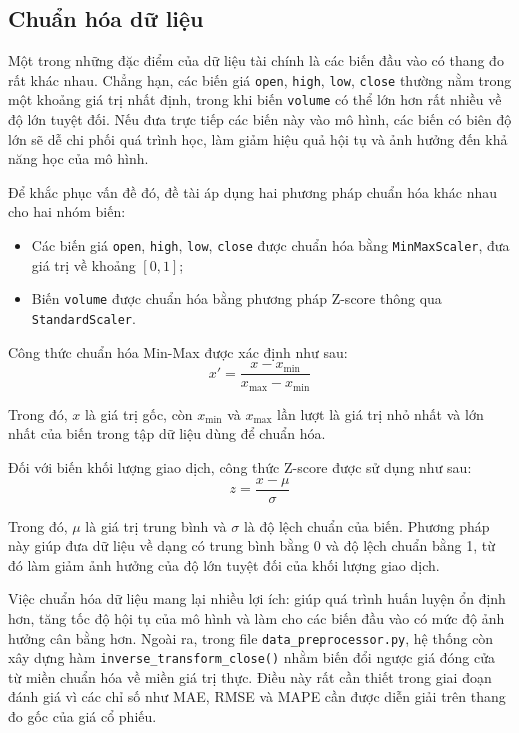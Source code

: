 \subsection{Chuẩn hóa dữ liệu}

Một trong những đặc điểm của dữ liệu tài chính là các biến đầu vào có thang đo rất khác nhau. Chẳng hạn, các biến giá \texttt{open}, \texttt{high}, \texttt{low}, \texttt{close} thường nằm trong một khoảng giá trị nhất định, trong khi biến \texttt{volume} có thể lớn hơn rất nhiều về độ lớn tuyệt đối. Nếu đưa trực tiếp các biến này vào mô hình, các biến có biên độ lớn sẽ dễ chi phối quá trình học, làm giảm hiệu quả hội tụ và ảnh hưởng đến khả năng học của mô hình.

Để khắc phục vấn đề đó, đề tài áp dụng hai phương pháp chuẩn hóa khác nhau cho hai nhóm biến:
\begin{itemize}
    \item Các biến giá \texttt{open}, \texttt{high}, \texttt{low}, \texttt{close} được chuẩn hóa bằng \texttt{MinMaxScaler}, đưa giá trị về khoảng $[0,1]$;
    \item Biến \texttt{volume} được chuẩn hóa bằng phương pháp Z-score thông qua \texttt{StandardScaler}.
\end{itemize}

Công thức chuẩn hóa Min-Max được xác định như sau:
\begin{equation}
    x' = \frac{x - x_{\min}}{x_{\max} - x_{\min}}
\end{equation}

Trong đó, $x$ là giá trị gốc, còn $x_{\min}$ và $x_{\max}$ lần lượt là giá trị nhỏ nhất và lớn nhất của biến trong tập dữ liệu dùng để chuẩn hóa.

Đối với biến khối lượng giao dịch, công thức Z-score được sử dụng như sau:
\begin{equation}
    z = \frac{x - \mu}{\sigma}
\end{equation}

Trong đó, $\mu$ là giá trị trung bình và $\sigma$ là độ lệch chuẩn của biến. Phương pháp này giúp đưa dữ liệu về dạng có trung bình bằng 0 và độ lệch chuẩn bằng 1, từ đó làm giảm ảnh hưởng của độ lớn tuyệt đối của khối lượng giao dịch.

Việc chuẩn hóa dữ liệu mang lại nhiều lợi ích: giúp quá trình huấn luyện ổn định hơn, tăng tốc độ hội tụ của mô hình và làm cho các biến đầu vào có mức độ ảnh hưởng cân bằng hơn. Ngoài ra, trong file \texttt{data\_preprocessor.py}, hệ thống còn xây dựng hàm \texttt{inverse\_transform\_close()} nhằm biến đổi ngược giá đóng cửa từ miền chuẩn hóa về miền giá trị thực. Điều này rất cần thiết trong giai đoạn đánh giá vì các chỉ số như MAE, RMSE và MAPE cần được diễn giải trên thang đo gốc của giá cổ phiếu.

